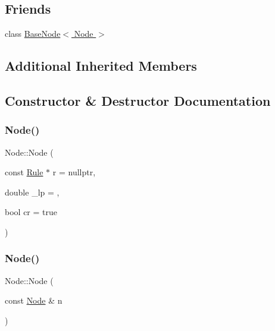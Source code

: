 \subsection*{Friends}
\begin{DoxyCompactItemize}
\item 
class \hyperlink{class_node_ae875dded1044564c83cdc7147d86dfbf}{Base\+Node$<$ Node $>$}
\end{DoxyCompactItemize}
\subsection*{Additional Inherited Members}


\subsection{Constructor \& Destructor Documentation}
\mbox{\label{class_node_ae33050869651f64551da2d13ad2a9dbc}} 
\subsubsection{\texorpdfstring{Node()}{Node()}\hspace{0.1cm}{\footnotesize\ttfamily [1/3]}}
{\footnotesize\ttfamily Node\+::\+Node (\begin{DoxyParamCaption}\item[{const \hyperlink{class_rule}{Rule} $\ast$}]{r = {\ttfamily nullptr},  }\item[{double}]{\+\_\+lp = {},  }\item[{bool}]{cr = {\ttfamily true} }\end{DoxyParamCaption})\hspace{0.3cm}{\ttfamily [inline]}}

\mbox{\label{class_node_a277918b68827f6ffd8150f450b0c12c3}} 
\subsubsection{\texorpdfstring{Node()}{Node()}\hspace{0.1cm}{\footnotesize\ttfamily [2/3]}}
{\footnotesize\ttfamily Node\+::\+Node (\begin{DoxyParamCaption}\item[{const \hyperlink{class_node}{Node} \&}]{n }\end{DoxyParamCaption})\hspace{0.3cm}{\ttfamily [inline]}}

